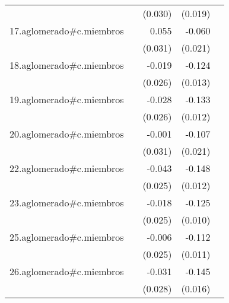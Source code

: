 {\begin{longtable}{l*{4}{D{.}{.}{-1}}}
            &                     &     (0.030)         &     (0.019)         &                     \\
\addlinespace
17.aglomerado#c.miembros&                     &       0.055         &      -0.060\sym{**} &                     \\
            &                     &     (0.031)         &     (0.021)         &                     \\
\addlinespace
18.aglomerado#c.miembros&                     &      -0.019         &      -0.124\sym{***}&                     \\
            &                     &     (0.026)         &     (0.013)         &                     \\
\addlinespace
19.aglomerado#c.miembros&                     &      -0.028         &      -0.133\sym{***}&                     \\
            &                     &     (0.026)         &     (0.012)         &                     \\
\addlinespace
20.aglomerado#c.miembros&                     &      -0.001         &      -0.107\sym{***}&                     \\
            &                     &     (0.031)         &     (0.021)         &                     \\
\addlinespace
22.aglomerado#c.miembros&                     &      -0.043         &      -0.148\sym{***}&                     \\
            &                     &     (0.025)         &     (0.012)         &                     \\
\addlinespace
23.aglomerado#c.miembros&                     &      -0.018         &      -0.125\sym{***}&                     \\
            &                     &     (0.025)         &     (0.010)         &                     \\
\addlinespace
25.aglomerado#c.miembros&                     &      -0.006         &      -0.112\sym{***}&                     \\
            &                     &     (0.025)         &     (0.011)         &                     \\
\addlinespace
26.aglomerado#c.miembros&                     &      -0.031         &      -0.145\sym{***}&                     \\
            &                     &     (0.028)         &     (0.016)         &                     \\

\end{longtable}}
